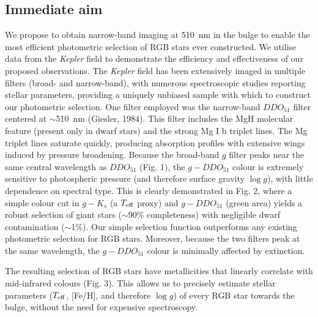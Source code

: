 \documentclass[a4paper]{article}
\begin{document}
\begin{ObservingProgram}
\subsection*{Immediate aim}

We propose to obtain narrow-band imaging at 510~nm in the bulge to enable the most efficient photometric selection of RGB stars ever constructed.  We utilise data from the \textit{Kepler} field to demonstrate the efficiency and effectiveness of our proposed observations.  The \textit{Kepler} field has been extensively imaged in multiple filters (broad- and narrow-band), with numerous spectroscopic studies reporting stellar parameters, providing a uniquely unbiased sample with which to construct our photometric selection. One  filter employed was the narrow-band $DDO_{51}$ filter centered at $\sim$510~nm (Giesler, 1984). This filter includes the MgH molecular feature (present only in dwarf stars) and the strong Mg I b triplet lines. The Mg triplet lines saturate quickly, producing absorption profiles with extensive wings induced by pressure broadening. Because the broad-band $g$ filter peaks near the same central wavelength as $DDO_{51}$ (Fig. 1), the $g-DDO_{51}$ colour is extremely sensitive to photospheric pressure (and therefore surface gravity $\log{g}$), with little dependence on spectral type.  This is clearly demonstrated in Fig. 2, where a simple colour cut in $g-K_s$ (a $T_{\rm eff}$ proxy) and $g - DDO_{51}$ (green area) yields a robust selection of giant stars ($\sim$90\% completeness) with negligible dwarf contamination ($\sim$1\%).  Our simple selection function outperforms any existing photometric selection for RGB stars.  Moreover, because the two filters peak at the same wavelength, the $g-DDO_{51}$ colour is minimally affected by extinction. 

The resulting selection of RGB stars have metallicities that linearly correlate with mid-infrared colours (Fig. 3). This allows us to precisely estimate stellar parameters ($T_{\rm eff}$, [Fe/H], and therefore $\log{g}$) of every RGB star towards the bulge, without the need for expensive spectroscopy. 




\end{ObservingProgram}
\end{document}
